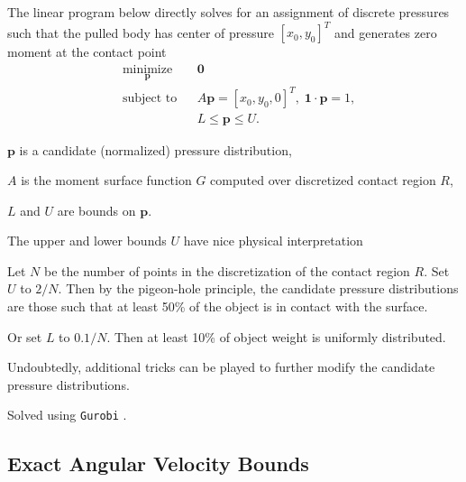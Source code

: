 \documentclass[conference]{IEEEtran}
\begin{document}
\begin{inparaenum}
\item The linear program below directly solves for an assignment of
  discrete pressures such that the pulled body has center of pressure
  $[x_0,y_0]^T$ and generates zero moment at the contact point
  \begin{equation}
    \begin{aligned}
      & \underset{\mathbf{p}}{\text{minimize}}
      & & \mathbf{0} \\
      & \text{subject to}
      & & A\mathbf{p} = [x_0,y_0,0]^T,\; \mathbf{1}\cdot\mathbf{p} = 1, \\
      & & & L \leq \mathbf{p} \leq U.
    \end{aligned} \label{eq:lin-prog-PiCH}
  \end{equation}
  \begin{inparaenum}
  \item $\mathbf{p}$ is a candidate (normalized) pressure distribution,
  \item $A$ is the moment surface function $G$ computed over
    discretized contact region $R$,
  \item $L$ and $U$ are bounds on $\mathbf{p}$.
  \end{inparaenum}
\item The upper and lower bounds $U$ have nice physical interpretation 
  \begin{inparaenum}
  \item Let $N$ be the number of points in the discretization of the
    contact region $R$. Set $U$ to $2/N$. Then by the pigeon-hole
    principle, the candidate pressure distributions are those such
    that at least 50\% of the object is in contact with the surface.
  \item Or set $L$ to $0.1/N$. Then at least 10\% of object weight is
    uniformly distributed.
  \item Undoubtedly, additional tricks can be played to further modify
    the candidate pressure distributions.
  \end{inparaenum}
\item Solved using \texttt{Gurobi} \cite{gurobi}.
\end{inparaenum}

\subsection{Exact Angular Velocity Bounds}\label{sec:exact-ang-vel-bound-alg}
\end{document}

